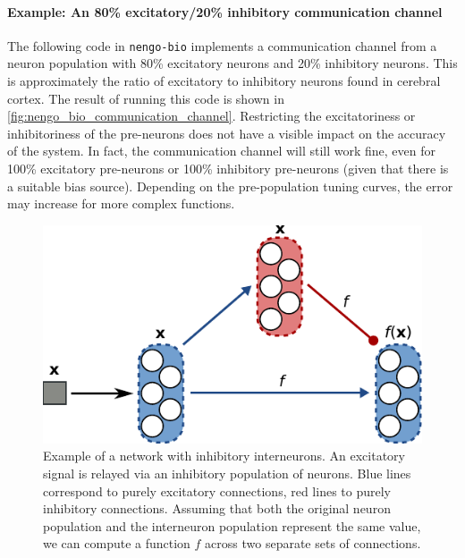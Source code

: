 \documentclass[10pt,letterpaper,oneside]{article}
\begin{document}
\paragraph{Example: An 80\% excitatory/20\% inhibitory communication channel}
The following code in \texttt{nengo-bio} implements a communication channel from a neuron population with 80\% excitatory neurons and 20\% inhibitory neurons. This is approximately the ratio of excitatory to inhibitory neurons found in cerebral cortex.
\cprotect{}
The result of running this code is shown in \cref{fig:nengo_bio_communication_channel}.  Restricting the excitatoriness or inhibitoriness of the pre-neurons does not have a visible impact on the accuracy of the system. In fact, the communication channel will still work fine, even for 100\% excitatory pre-neurons or 100\% inhibitory pre-neurons (given that there is a suitable bias source). Depending on the pre-population tuning curves, the error may increase for more complex functions.

\begin{figure}
	\centering
	\includegraphics{media/inhibitory_interneuron_network.pdf}
	\caption{Example of a network with inhibitory interneurons. An excitatory signal is relayed via an inhibitory population of neurons. Blue lines correspond to purely excitatory connections, red lines to purely inhibitory connections. Assuming that both the original neuron population and the interneuron population represent the same value, we can compute a function $f$ across two separate sets of connections.}
	\label{fig:inhibitory_interneuron_network}
\end{figure}
\end{document}
